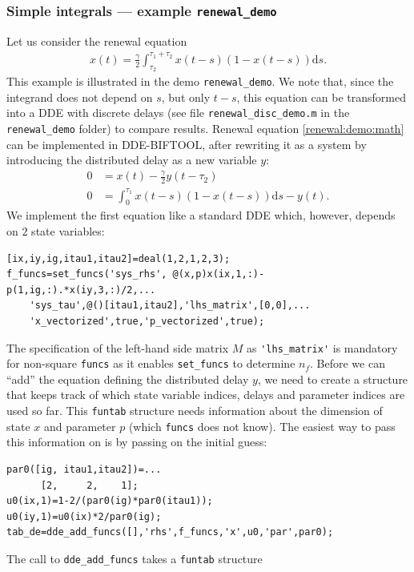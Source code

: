 \documentclass[10pt]{scrartcl}
\newcommand{\DDEBIFCODE}{\textsc{DDE-BIFTOOL}}
\renewcommand{\d}{\mathrm{d}}
\newcommand{\blist}[1]{\mbox{\lstinline!#1!}}
\begin{document}
\subsubsection{Simple integrals --- example \blist{renewal_demo}}
\label{sec:distdelay:simple}
Let us consider the renewal equation \cite{breda2016numerical}
\begin{align}
  \label{renewal:demo:math}
  x(t)=\frac{\gamma}{2}\int_{\tau_2}^{\tau_1+\tau_2}x(t-s)(1-x(t-s))\d s.
\end{align}
This example is illustrated in the demo \blist{renewal_demo}. We note
that, since the integrand does not depend on $s$, but only $t-s$, this
equation can be transformed into a DDE with discrete delays (see file
\texttt{renewal\_disc\_demo.m} in the \texttt{renewal\_demo} folder)
to compare results.  Renewal equation \eqref{renewal:demo:math}  can be implemented in
{\DDEBIFCODE}, after rewriting it as a system by introducing the distributed delay as a new variable $y$:
\begin{align}
  0&=x(t)-\frac{\gamma}{2}y(t-\tau_2)\label{renewal:dde}\\
  0&=\int_0^{\tau_1}x(t-s)(1-x(t-s))\d s-y(t).\label{renewal:dist}
\end{align}
We implement the first equation like a standard DDE which, however, depends on $2$ state variables:
\begin{lstlisting}
[ix,iy,ig,itau1,itau2]=deal(1,2,1,2,3);
f_funcs=set_funcs('sys_rhs', @(x,p)x(ix,1,:)-p(1,ig,:).*x(iy,3,:)/2,...
    'sys_tau',@()[itau1,itau2],'lhs_matrix',[0,0],...
    'x_vectorized',true,'p_vectorized',true);  
\end{lstlisting}
The specification of the left-hand side matrix $M$ as \blist{'lhs_matrix'} is mandatory for
non-square \blist{funcs} as it enables \blist{set_funcs} to determine
$n_f$. Before we can ``add'' the equation defining the distributed delay $y$, we need to create a structure that keeps track of which state variable indices, delays and parameter indices are used so far. This \blist{funtab} structure needs information about the dimension of state $x$ and parameter $p$ (which \blist{funcs} does not know). The easiest way to pass this information on is by passing on the initial guess:
\begin{lstlisting}
par0([ig, itau1,itau2])=...
      [2,     2,    1];
u0(ix,1)=1-2/(par0(ig)*par0(itau1));
u0(iy,1)=u0(ix)*2/par0(ig);
tab_de=dde_add_funcs([],'rhs',f_funcs,'x',u0,'par',par0);  
\end{lstlisting}
The call to \blist{dde_add_funcs} takes a \blist{funtab} structure
\end{document}

